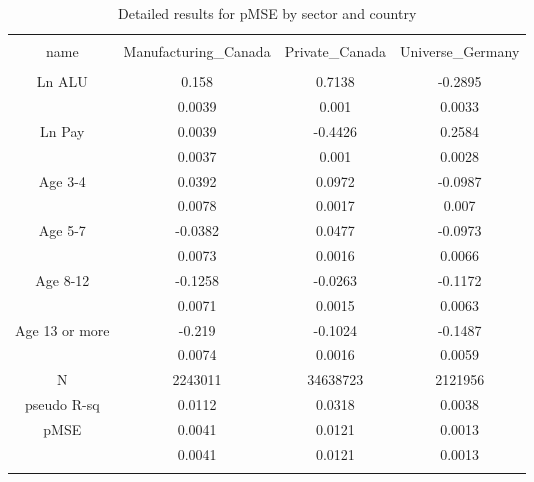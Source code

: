
\begin{table}[!htbp] \centering 
  \caption{Detailed results for pMSE by sector and country} 
  \label{tab:pmse:details} 
\begin{tabular}{@{\extracolsep{5pt}} cccc} 
\\[-1.8ex]\hline 
\hline \\[-1.8ex] 
name & Manufacturing\_Canada & Private\_Canada & Universe\_Germany \\ 
\hline \\[-1.8ex] 
Ln ALU & 0.158 & 0.7138 & -0.2895 \\ 
 & 0.0039 & 0.001 & 0.0033 \\ 
Ln Pay & 0.0039 & -0.4426 & 0.2584 \\ 
 & 0.0037 & 0.001 & 0.0028 \\ 
Age 3-4 & 0.0392 & 0.0972 & -0.0987 \\ 
 & 0.0078 & 0.0017 & 0.007 \\ 
Age 5-7 & -0.0382 & 0.0477 & -0.0973 \\ 
 & 0.0073 & 0.0016 & 0.0066 \\ 
Age 8-12 & -0.1258 & -0.0263 & -0.1172 \\ 
 & 0.0071 & 0.0015 & 0.0063 \\ 
Age 13 or more & -0.219 & -0.1024 & -0.1487 \\ 
 & 0.0074 & 0.0016 & 0.0059 \\ 
N & 2243011 & 34638723 & 2121956 \\ 
pseudo R-sq & 0.0112 & 0.0318 & 0.0038 \\ 
pMSE & 0.0041 & 0.0121 & 0.0013 \\ 
 & 0.0041 & 0.0121 & 0.0013 \\ 
\hline \\[-1.8ex] 
\end{tabular} 
\end{table} 
